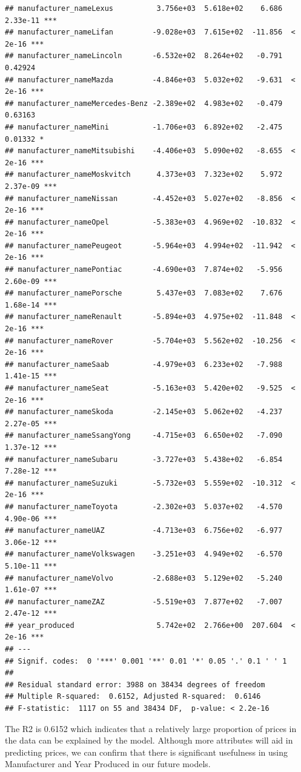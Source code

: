 \documentclass[
]{article}
\begin{document}
\begin{verbatim}
## manufacturer_nameLexus          3.756e+03  5.618e+02    6.686 2.33e-11 ***
## manufacturer_nameLifan         -9.028e+03  7.615e+02  -11.856  < 2e-16 ***
## manufacturer_nameLincoln       -6.532e+02  8.264e+02   -0.791  0.42924    
## manufacturer_nameMazda         -4.846e+03  5.032e+02   -9.631  < 2e-16 ***
## manufacturer_nameMercedes-Benz -2.389e+02  4.983e+02   -0.479  0.63163    
## manufacturer_nameMini          -1.706e+03  6.892e+02   -2.475  0.01332 *  
## manufacturer_nameMitsubishi    -4.406e+03  5.090e+02   -8.655  < 2e-16 ***
## manufacturer_nameMoskvitch      4.373e+03  7.323e+02    5.972 2.37e-09 ***
## manufacturer_nameNissan        -4.452e+03  5.027e+02   -8.856  < 2e-16 ***
## manufacturer_nameOpel          -5.383e+03  4.969e+02  -10.832  < 2e-16 ***
## manufacturer_namePeugeot       -5.964e+03  4.994e+02  -11.942  < 2e-16 ***
## manufacturer_namePontiac       -4.690e+03  7.874e+02   -5.956 2.60e-09 ***
## manufacturer_namePorsche        5.437e+03  7.083e+02    7.676 1.68e-14 ***
## manufacturer_nameRenault       -5.894e+03  4.975e+02  -11.848  < 2e-16 ***
## manufacturer_nameRover         -5.704e+03  5.562e+02  -10.256  < 2e-16 ***
## manufacturer_nameSaab          -4.979e+03  6.233e+02   -7.988 1.41e-15 ***
## manufacturer_nameSeat          -5.163e+03  5.420e+02   -9.525  < 2e-16 ***
## manufacturer_nameSkoda         -2.145e+03  5.062e+02   -4.237 2.27e-05 ***
## manufacturer_nameSsangYong     -4.715e+03  6.650e+02   -7.090 1.37e-12 ***
## manufacturer_nameSubaru        -3.727e+03  5.438e+02   -6.854 7.28e-12 ***
## manufacturer_nameSuzuki        -5.732e+03  5.559e+02  -10.312  < 2e-16 ***
## manufacturer_nameToyota        -2.302e+03  5.037e+02   -4.570 4.90e-06 ***
## manufacturer_nameUAZ           -4.713e+03  6.756e+02   -6.977 3.06e-12 ***
## manufacturer_nameVolkswagen    -3.251e+03  4.949e+02   -6.570 5.10e-11 ***
## manufacturer_nameVolvo         -2.688e+03  5.129e+02   -5.240 1.61e-07 ***
## manufacturer_nameZAZ           -5.519e+03  7.877e+02   -7.007 2.47e-12 ***
## year_produced                   5.742e+02  2.766e+00  207.604  < 2e-16 ***
## ---
## Signif. codes:  0 '***' 0.001 '**' 0.01 '*' 0.05 '.' 0.1 ' ' 1
## 
## Residual standard error: 3988 on 38434 degrees of freedom
## Multiple R-squared:  0.6152, Adjusted R-squared:  0.6146 
## F-statistic:  1117 on 55 and 38434 DF,  p-value: < 2.2e-16
\end{verbatim}

The R2 is 0.6152 which indicates that a relatively large proportion of
prices in the data can be explained by the model. Although more
attributes will aid in predicting prices, we can confirm that there is
significant usefulness in using Manufacturer and Year Produced in our
future models.
\end{document}
